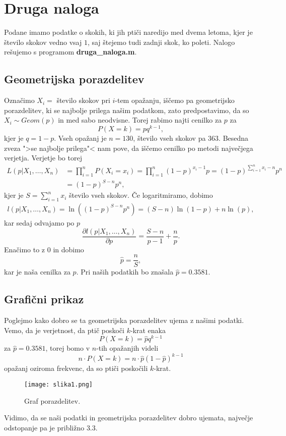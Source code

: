 \documentclass[a4paper,12pt]{article}
\begin{document}
\section{Druga naloga}
Podane imamo podatke o skokih, ki jih ptiči naredijo med dvema letoma, kjer je število skokov vedno vsaj $1$, saj štejemo tudi zadnji skok, ko 
poleti. Nalogo rešujemo s programom \textbf{druga\_naloga.m}.
\subsection{Geometrijska porazdelitev}
Označimo $X_i =$ število skokov pri $i$-tem opažanju, iščemo pa geometrijsko porazdelitev, ki se najbolje prilega našim podatkom, 
zato predpostavimo, da so $X_i \sim Geom(p)$ in med sabo neodvisne. Torej rabimo najti cenilko za $p$ za 
\begin{equation*}
    P(X = k) = pq^{k-1},
\end{equation*}
kjer je $q = 1-p$. Vseh opažanj je $n = 130$, število vseh skokov pa $363$. 
Besedna zveza 
">se najbolje prilega"< nam pove, da iščemo cenilko po metodi največjega verjetja.
Verjetje bo torej
\begin{align*}
    L(p|X_1, \ldots, X_n) &= \prod_{i=1}^{n}P(X_i = x_i) = \prod_{i=1}^{n}(1-p)^{x_i-1}p = (1-p)^{\sum_{i=1}^{n}x_i-n}p^n \\
    &= (1-p)^{S-n}p^n,
\end{align*}
kjer je $S = \sum_{i=1}^{n}x_i$ število vseh skokov.
Če logaritmiramo, dobimo
\begin{align*}
    l(p|X_1, \ldots, X_n) = \ln((1-p)^{S-n}p^n)= (S-n)\ln(1-p) +n\ln(p),
\end{align*}
kar sedaj odvajamo po $p$
\begin{equation*}
    \frac{\partial l(p|X_1, \ldots, X_n)}{\partial p} = \frac{S-n}{p-1} + \frac{n}{p}.
\end{equation*}
Enačimo to z $0$ in dobimo 
\begin{equation*}
    \widehat{p} = \frac{n}{S},
\end{equation*}
kar je naša cenilka za $p$. Pri naših podatkih bo znašala $\widehat{p} =0.3581$.
%
%
\subsection{Grafični prikaz}
Poglejmo kako dobro se ta geometrijska porazdelitev ujema z našimi podatki. Vemo, da je verjetnost, da ptič poskoči $k$-krat enaka
\begin{equation*}
    P(X = k) = \widehat{p}q^{k-1}
\end{equation*}
za $\widehat{p} =0.3581$, torej bomo v $n$-tih opažanjih videli 
\begin{equation*}
    n \cdot P(X = k) = n \cdot \widehat{p}(1-\widehat{p})^{k-1}
\end{equation*}
opažanj oziroma frekvenc, da so ptiči poskočili $k$-krat.
\begin{figure}[H]  
	\centering
	\texttt{[image: slika1.png]}
	\caption{Graf porazdelitev.}
\end{figure}
Vidimo, da se naši podatki in geometrijska porazdelitev dobro ujemata, največje odstopanje pa je približno $3.3$.
%
%
\end{document}
